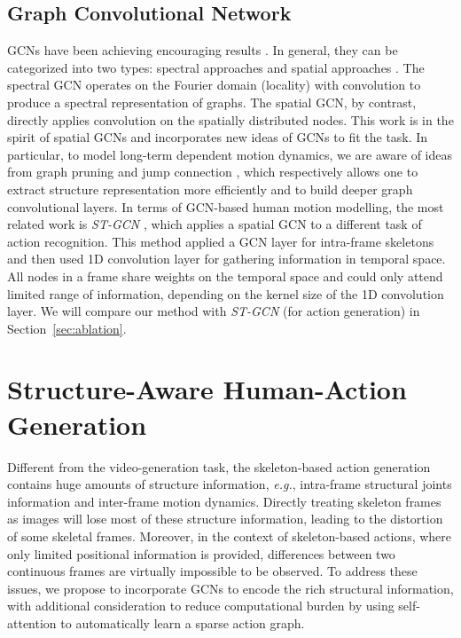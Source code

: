 \documentclass[runningheads]{llncs}
\begin{document}
\subsection{Graph Convolutional Network}
GCNs have been achieving encouraging results \cite{yan2018spatial}. In general, they can be categorized into two types: spectral approaches \cite{bruna2013spectral,kipf2016semi} and spatial approaches \cite{zhou2018graph,niepert2016learning}. The spectral GCN operates on the Fourier domain (locality) with convolution to produce a spectral representation of graphs. The spatial GCN, by contrast, directly applies convolution on the spatially distributed nodes. This work is in the spirit of spatial GCNs and incorporates new ideas of GCNs to fit the task. In particular, to model long-term dependent motion dynamics, we are aware of ideas from graph pruning \cite{zhang2018graph} and jump connection \cite{xu2018representation}, which respectively allows one to extract structure representation more efficiently and to build deeper graph convolutional layers. In terms of GCN-based human motion modelling, the most related work is {\it ST-GCN} \cite{yan2018spatial}, which applies a spatial GCN to a different task of action recognition. This method applied a GCN layer for intra-frame skeletons and then used 1D convolution layer for gathering information in temporal space. All nodes in a frame share weights on the temporal space and could only attend limited range of information, depending on the kernel size of the 1D convolution layer. We will compare our method with {\it ST-GCN} (for action generation) in Section~\ref{sec:ablation}.




\section{Structure-Aware Human-Action Generation}
Different from the video-generation task, the skeleton-based action generation contains huge amounts of structure information, {\it e.g.}, intra-frame structural joints information and inter-frame motion dynamics. Directly treating skeleton frames as images will lose most of these structure information, leading to the distortion of some skeletal frames. Moreover, in the context of skeleton-based actions, where only limited positional information is provided, differences between two continuous frames are virtually impossible to be observed.
To address these issues, we propose to incorporate GCNs to encode the rich structural information, with additional consideration to reduce computational burden by using self-attention to automatically learn a sparse action graph. 
\end{document}
